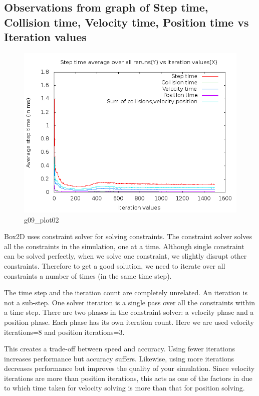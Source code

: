 \documentclass[11pt,english]{article}
\begin{document}
\subsection{Observations from graph of Step time, Collision time, Velocity time, Position time vs Iteration values}
\begin{figure}[h!]
\centering
\includegraphics[scale=.45]{g09_plot02.png}
\caption{g09\_plot02}
\end{figure}
\indent \par{Box2D uses constraint solver for solving constraints. The constraint solver solves all the constraints in the simulation, one at a time. Although single constraint can be solved perfectly, when we solve one constraint, we slightly disrupt other constraints. Therefore to get a good solution, we need to iterate over all constraints a number of times (in the same time step).}

\indent \par{The time step and the iteration count are completely unrelated. An iteration is not a sub-step. One solver iteration is a single pass over all the constraints within a time step.
There are two phases in the constraint solver: a velocity phase and a position phase. Each phase has its own iteration count. Here we are used velocity iterations=8 and position iterations=3.}

\indent \par{
This creates a trade-off between speed and accuracy. Using fewer iterations increases performance but accuracy suffers. Likewise, using more iterations decreases performance but improves the quality of your simulation. Since velocity iterations are more than position iterations, this acts as one of the factors in due to which time taken for velocity solving is more than that for position solving.
}
\end{document}
